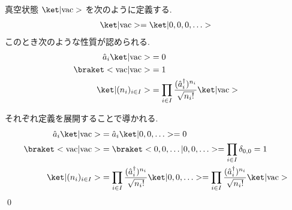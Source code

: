\documentclass[uplatex,dvipdfmx,a4paper,11pt]{jlreq}
\makeatletter
\numberwithin{equation}{section}
\theoremstyle{definition}
\renewenvironment{proof}[1][\proofname]{\par
  \normalfont
  \topsep6\p@\@plus6\p@ \trivlist
  \item[\hskip\labelsep{\bfseries #1}\@addpunct{\bfseries}]\ignorespaces\quad\par
}{%
  \qed\endtrivlist\@endpefalse
}
\renewcommand\proofname{証明}
\makeatother
\begin{document}
\begin{proposition}
  真空状態 $\ket|\mathrm{vac}>$ を次のように定義する.
  \begin{align}
    \ket|\mathrm{vac}> = \ket|0,0,0,\ldots>
  \end{align}
  このとき次のような性質が認められる.
  \begin{align}
    \hat{a}_i\ket|\mathrm{vac}>        & = 0                                                                             \\
    \braket<\mathrm{vac}|\mathrm{vac}> & = 1                                                                             \\
    \ket|(n_i)_{i\in I}>               & = \prod_{i\in I}\frac{(\hat{a}_i^\dagger)^{n_i}}{\sqrt{n_i!}}\ket|\mathrm{vac}>
  \end{align}
\end{proposition}
\begin{proof}
  それぞれ定義を展開することで導かれる.
  \begin{align}
    \hat{a}_i\ket|\mathrm{vac}>        & = \hat{a}_i\ket|0,0,\ldots> = 0                                                                                                                               \\
    \braket<\mathrm{vac}|\mathrm{vac}> & = \braket<0,0,\ldots|0,0,\ldots> = \prod_{i\in I}\delta_{0,0} = 1                                                                                             \\
    \ket|(n_i)_{i\in I}>               & = \prod_{i\in I}\frac{(\hat{a}_i^\dagger)^{n_i}}{\sqrt{n_i!}}\ket|0,0,\ldots> = \prod_{i\in I}\frac{(\hat{a}_i^\dagger)^{n_i}}{\sqrt{n_i!}}\ket|\mathrm{vac}>
  \end{align}
\end{proof}
\end{document}
